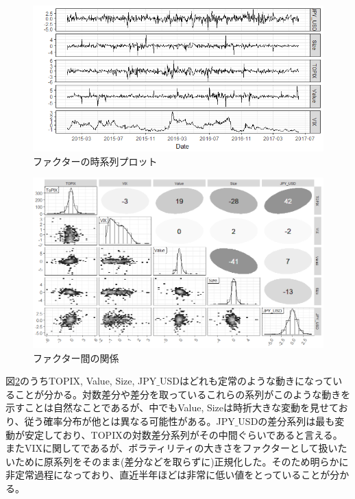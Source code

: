 \documentclass[11pt]{jreport}
\begin{document}
\begin{figure}[H]
	\begin{center}
		\includegraphics[width=15cm]{./fig/factor_plot.png}
		\caption{ファクターの時系列プロット}
		\label{fig:factor_plot}
	\end{center}
\end{figure}

\begin{figure}[H]
	\begin{center}
		\includegraphics[width=15cm]{./fig/factor_cor.png}
		\caption{ファクター間の関係}
		\label{fig:factor_cor}
	\end{center}
\end{figure}

図\ref{fig:factor_cor}のうちTOPIX, Value, Size, JPY$\_$USDはどれも定常のような動きになっていることが分かる。対数差分や差分を取っているこれらの系列がこのような動きを示すことは自然なことであるが、中でもValue, Sizeは時折大きな変動を見せており、従う確率分布が他とは異なる可能性がある。JPY$\_$USDの差分系列は最も変動が安定しており、TOPIXの対数差分系列がその中間ぐらいであると言える。またVIXに関してであるが、ボラティリティの大きさをファクターとして扱いたいために原系列をそのまま(差分などを取らずに)正規化した。そのため明らかに非定常過程になっており、直近半年ほどは非常に低い値をとっていることが分かる。
\end{document}
